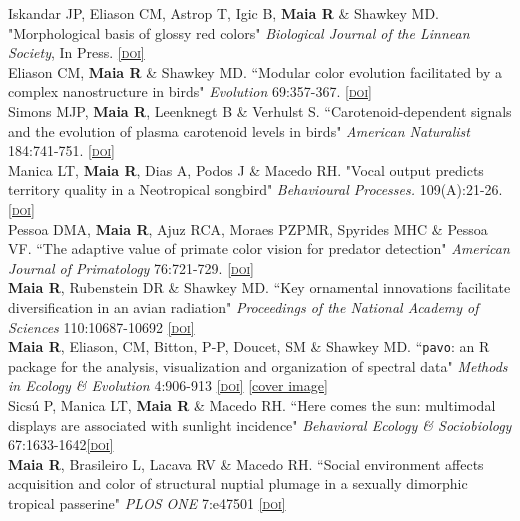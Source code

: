 \documentclass[10pt]{article}
\newcommand{\doi}[1]{\href{http://dx.doi.org/#1}{\scriptsize\textsc{[doi]}}}
\newcommand{\years}[1]{\marginnote{\raggedleft\scriptsize #1}}
\begin{document}
\years{} Iskandar JP, Eliason CM, Astrop T, Igic B, \textbf{Maia R} \& Shawkey MD. "Morphological basis of glossy red colors" \emph{Biological Journal of the Linnean Society}, In Press. \doi{10.1111/bij.12810}\\

\years{2015} Eliason CM, \textbf{Maia R} \& Shawkey MD. “Modular color evolution facilitated by a complex nanostructure in birds" \emph{Evolution} 69:357-367. \doi{10.1111/evo.12575} \\

\years{2014} Simons MJP\dag, \textbf{Maia R\dag}, Leenknegt B \& Verhulst S. “Carotenoid-dependent signals and the evolution of plasma carotenoid levels in birds" \emph{American Naturalist} 184:741-751. \doi{10.1086/678402}\\

\years{} Manica LT, \textbf{Maia R}, Dias A, Podos J \& Macedo RH. "Vocal output predicts territory quality in a Neotropical songbird" \emph{Behavioural Processes.} 109(A):21-26. \doi{10.1016/j.beproc.2014.07.004}\\

\years{} Pessoa DMA, \textbf{Maia R}, Ajuz RCA, Moraes PZPMR, Spyrides MHC \& Pessoa VF. “The adaptive value of primate color vision for predator detection" \emph{American Journal of Primatology} 76:721-729. \doi{10.1002/ajp.22264}\\

\years{2013} \textbf{Maia R}, Rubenstein DR \& Shawkey MD. “Key ornamental innovations facilitate diversification in an avian radiation" \emph{Proceedings of the National Academy of Sciences} 110:10687-10692 \doi{10.1073/pnas.1220784110}\\

\years{}  \textbf{Maia R}, Eliason, CM, Bitton, P-P, Doucet, SM \& Shawkey MD. “\texttt{pavo}: an R package for the analysis, visualization and organization of spectral data" \emph{Methods in Ecology \& Evolution} 4:906-913 \doi{10.1111/2041-210X.12069} \href{http://www.methodsinecologyandevolution.org/view/0/covergallery.html#4-10}{\scriptsize{[cover image]}}\\

\years{} Sics\'{u} P, Manica LT,  \textbf{Maia R} \& Macedo RH. “Here comes the sun: multimodal displays are associated with sunlight incidence" \emph{Behavioral Ecology \& Sociobiology} 67:1633-1642\doi{10.1007/s00265-013-1574-x}\\

\years{2012}  \textbf{Maia R}, Brasileiro L, Lacava RV \& Macedo RH. “Social environment affects acquisition and color of structural nuptial plumage in a sexually dimorphic tropical passerine" \emph{PLOS ONE} 7:e47501 \doi{10.1371/journal.pone.0047501}\\
\end{document}
